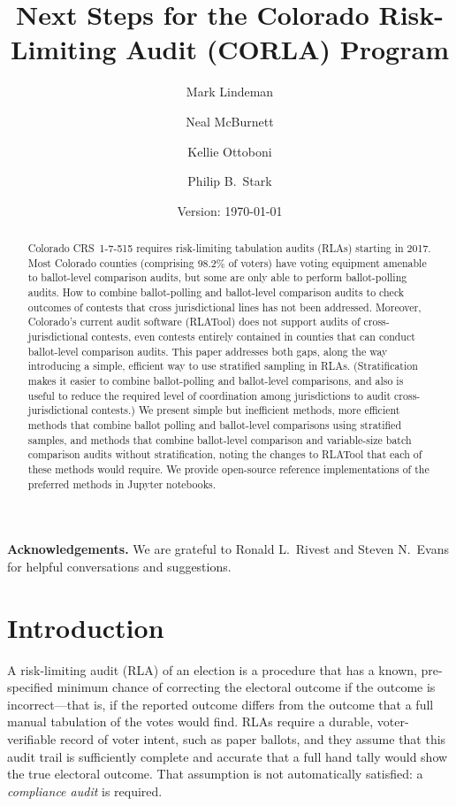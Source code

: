 \documentclass[runningheads]{llncs}
\title{Next Steps for the Colorado Risk-Limiting Audit (CORLA) Program}
\author{
   Mark Lindeman\inst{1}\orcidID{x} \and
   Neal McBurnett\inst{2}\orcidID{0000-0001-8667-1830} \and
   Kellie Ottoboni\inst{3}\orcidID{0000-0002-9107-3402} \and
   Philip B.~Stark\inst{3}\orcidID{0000-0002-3771-9604}
}
\institute{Columbia University, NY, USA \and
Neal's affiliation \and
Department of Statistics, University of California, Berkeley, CA, USA}
\date{Version: \today}
\begin{document}
\maketitle


\begin{abstract}
Colorado CRS~1-7-515 requires risk-limiting tabulation audits (RLAs) starting in 2017.
Most Colorado counties (comprising 98.2\% of voters) have voting equipment amenable to ballot-level comparison audits, but some
are only able to perform ballot-polling audits. 
How to combine ballot-polling and ballot-level comparison audits to check outcomes of contests that cross jurisdictional lines has not been addressed.
Moreover, Colorado's current audit software (RLATool) does not support audits of cross-jurisdictional contests, even contests entirely
contained in counties that can conduct ballot-level comparison audits. 
This paper addresses both gaps, along the way introducing a simple, efficient way to use 
stratified sampling in RLAs.
(Stratification makes it easier to combine ballot-polling and ballot-level comparisons, and also is useful to reduce the
required level of coordination among jurisdictions to audit cross-jurisdictional contests.)
We present simple but inefficient methods, more efficient methods
that combine ballot polling and ballot-level comparisons using stratified samples,
and methods that combine ballot-level comparison and
variable-size batch comparison audits without stratification,
noting the changes to RLATool that each of these methods would require.
We provide open-source reference implementations of the preferred methods in Jupyter notebooks.
\end{abstract}

\noindent
\textbf{Acknowledgements.}
We are grateful to Ronald L.~Rivest and Steven N.~Evans for helpful conversations and suggestions.

\section{Introduction}
A risk-limiting audit (RLA) of an election is a procedure that
has a known, pre-specified minimum chance of correcting the electoral outcome if the outcome
is incorrect---that is, if the reported outcome differs from the outcome that a full manual
tabulation of the votes would find. 
RLAs require a durable, voter-verifiable record of voter intent, such as paper ballots,
and they assume that this audit trail is sufficiently complete and accurate that a full hand
tally would show the true electoral outcome.
That assumption is not automatically satisfied: a \emph{compliance audit}
\cite{starkWagner12} 
is required.
\end{document}
